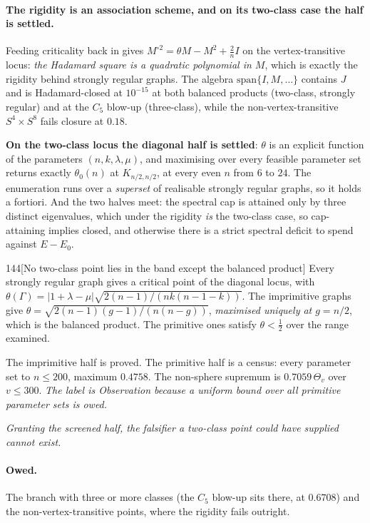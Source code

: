 \paragraph{The rigidity is an association scheme, and on its two-class case the half is settled.} Feeding criticality back in gives $M^{\circ2}=\theta M-M^2+\tfrac2nI$ on the vertex-transitive locus: \emph{the Hadamard square is a quadratic polynomial in $M$}, which is exactly the rigidity behind strongly regular graphs. The algebra $\mathrm{span}\{I,M,\dots\}$ contains $J$ and is Hadamard-closed at $10^{-15}$ at both balanced products (two-class, strongly regular) and at the $C_5$ blow-up (three-class), while the non-vertex-transitive $S^4\times S^8$ fails closure at $0.18$.

\textbf{On the two-class locus the diagonal half is settled}: $\theta$ is an explicit function of the parameters $(n,k,\lambda,\mu)$, and maximising over every feasible parameter set returns exactly $\theta_0(n)$ at $K_{n/2,n/2}$, at every even $n$ from $6$ to $24$. The enumeration runs over a \emph{superset} of realisable strongly regular graphs, so it holds a fortiori. And the two halves meet: the spectral cap is attained only by three distinct eigenvalues, which under the rigidity \emph{is} the two-class case, so cap-attaining implies closed, and otherwise there is a strict spectral deficit to spend against $E-E_0$.

\begin{Obs}{144}[No two-class point lies in the band except the balanced product]
Every strongly regular graph gives a critical point of the diagonal locus, with $\theta(\Gamma)=\lvert1+\lambda-\mu\rvert\sqrt{2(n-1)/(nk(n-1-k))}$. The imprimitive graphs give $\theta=\sqrt{2(n-1)(g-1)/(n(n-g))}$, \emph{maximised uniquely at $g=n/2$}, which is the balanced product. The primitive ones satisfy $\theta<\tfrac12$ over the range examined.
\end{Obs}

\begin{certificate}
The imprimitive half is proved. The primitive half is a census: every parameter set to $n\le200$, maximum $0.4758$. The non-sphere supremum is $0.7059\,\Theta_v$ over $v\le300$. \emph{The label is Observation because a uniform bound over all primitive parameter sets is owed.}
\end{certificate}

\emph{Granting the screened half, the falsifier a two-class point could have supplied cannot exist.}

\paragraph{Owed.} The branch with three or more classes (the $C_5$ blow-up sits there, at $0.6708$) and the non-vertex-transitive points, where the rigidity fails outright.


